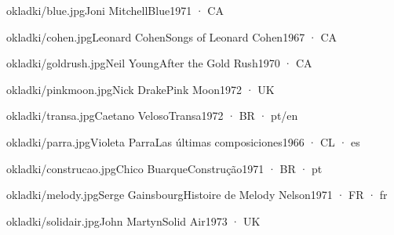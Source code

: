 \documentclass[10pt,twoside]{article}
\begin{document}
\stronatytulowa
\tableofcontents

\lipsum[1-3] %

\lipsum[4] %

\begin{album}{okladki/blue.jpg}{Joni Mitchell}{Blue}{1971 · CA}
\lipsum[5][1-3]
\end{album}

\begin{album}{okladki/cohen.jpg}{Leonard Cohen}{Songs of Leonard Cohen}{1967 · CA}
\lipsum[6][1-3]
\end{album}

\begin{album}{okladki/goldrush.jpg}{Neil Young}{After the Gold Rush}{1970 · CA}
\lipsum[7][1-3]
\end{album}

\begin{album}{okladki/pinkmoon.jpg}{Nick Drake}{Pink Moon}{1972 · UK}
\lipsum[8][1-3]
\end{album}

\begin{album}{okladki/transa.jpg}{Caetano Veloso}{Transa}{1972 · BR · pt/en}
\lipsum[9][1-3]
\end{album}

\begin{album}{okladki/parra.jpg}{Violeta Parra}{Las últimas composiciones}{1966 · CL · es}
\lipsum[10][1-3]
\end{album}

\lipsum[11]

\begin{album}{okladki/construcao.jpg}{Chico Buarque}{Construção}{1971 · BR · pt}
\lipsum[12][1-3]
\end{album}

\begin{album}{okladki/melody.jpg}{Serge Gainsbourg}{Histoire de Melody Nelson}{1971 · FR · fr}
\lipsum[13][1-3]
\end{album}

\begin{album}{okladki/solidair.jpg}{John Martyn}{Solid Air}{1973 · UK}
\lipsum[14][1-3]
\end{album}
\end{document}
